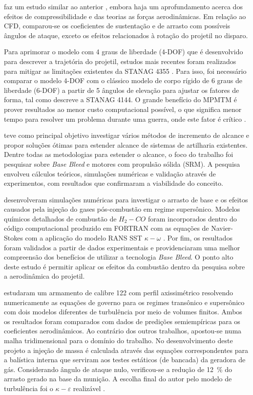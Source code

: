 \cite{Sor2012Nov} faz um estudo similar ao anterior \cite{torangatti2basawaraj}, embora haja um aprofundamento acerca dos efeitos de compressibilidade e das teorias as forças aerodinâmicas. Em relação ao CFD, comparou-se os coeficientes de sustentação e de arrasto com possíveis ângulos de ataque, exceto os efeitos relacionados à rotação do projetil no disparo.

Para aprimorar o modelo com 4 graus de liberdade (4-DOF) que é desenvolvido para descrever a trajetória do projetil, estudos mais recentes foram realizados para mitigar as limitações existentes da STANAG 4355 \cite{Baranowski2013-1,Baranowski2013-2,Baranowski2013-3}. Para isso, foi necessário comparar o modelo 4-DOF com o clássico modelo de corpo rígido de 6 graus de liberdade (6-DOF) a partir de 5 ângulos de elevação para ajustar os fatores de forma, tal como descreve a STANAG 4144. O grande benefício do MPMTM é prover resultados ao menor custo computacional possível, o que significa menor tempo para resolver um problema durante uma guerra, onde este fator é crítico \cite{Baranowski2013-2}.

\cite{Jelic2016Aug} teve como principal objetivo investigar vários métodos de incremento de alcance e propor soluções ótimas para estender alcance de sistemas de artilharia existentes. Dentre todas as metodologias para estender o alcance, o foco do trabalho foi pesquisar sobre \textit{Base Bleed} e motores com propulsão sólida (SRM). A pesquisa envolveu cálculos teóricos, simulações numéricas e validação através de experimentos, com resultados que confirmaram a viabilidade do conceito. 
	
\cite{Xue2016Oct} desenvolveram simulações numéricas para investigar o arrasto de base e os efeitos causados pela injeção do gases pós-combustão em regime supersônico. Modelos químicos detalhados de combustão de \(H_{2}-CO\) foram incorporados dentro do código computacional produzido em FORTRAN com as equações de Navier-Stokes com a aplicação do modelo RANS SST \(\kappa-\omega\) \cite{Menter1994TwoequationET}. Por fim, os resultados foram validados a partir de dados experimentais e providenciaram uma melhor compreensão dos benefícios de utilizar a tecnologia \textit{Base Bleed}. O ponto alto deste estudo é permitir aplicar os efeitos da combustão dentro da pesquisa sobre a aerodinâmica do projetil. 
	
\cite{belaidouni2016} estudaram um armamento de calibre \qty{122}{\millimetre} com perfil axissimétrico resolvendo numericamente as equações de governo para os regimes transônico e supersônico com dois modelos diferentes de turbulência por meio de volumes finitos. Ambos os resultados foram comparados com dados de predições semiempíricas para os coeficientes aerodinâmicos. Ao contrário dos outros trabalhos, apostou-se numa malha tridimensional para o domínio do trabalho. No desenvolvimento deste projeto a injeção de massa é calculada através das equações correspondentes para a balística interna que serviram aos testes estáticos (de bancada) da geradora de gás. Considerando ângulo de ataque nulo, verificou-se a redução de \qty{12}{\percent} do arrasto gerado na base da munição. A escolha final do autor pelo modelo de turbulência foi o \(\kappa-\varepsilon\) realizável \cite{shihNewKEddy1995}.
	

